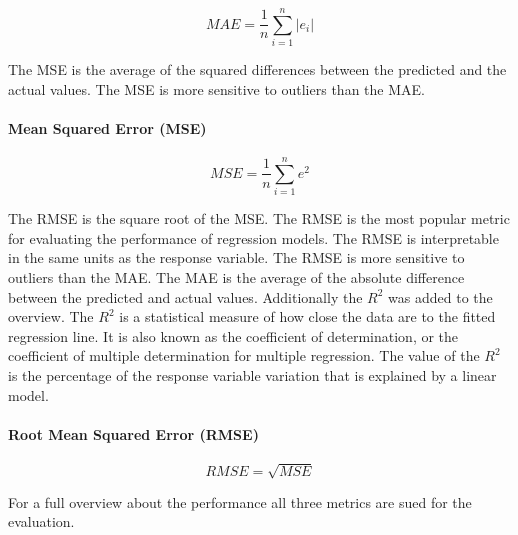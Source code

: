 \begin{equation}
    \label{eq:mae}
    MAE = \frac{1}{n} \sum_{i=1}^{n} |e_i|
\end{equation}

The MSE is the average of the squared differences between the predicted and the actual values. The MSE is more sensitive to outliers than the MAE.

\paragraph*{Mean Squared Error (MSE)}

\begin{equation}
    \label{eq:mse}
    MSE = \frac{1}{n} \sum_{i=1}^{n} e^2
\end{equation}

The RMSE is the square root of the MSE. The RMSE is the most popular metric for evaluating the performance of regression models. The RMSE is interpretable in the same units as the response variable. The RMSE is more sensitive to outliers than the MAE.
The MAE is the average of the absolute difference between the predicted and actual values.
Additionally the $R^2$ was added to the overview. The $R^2$ is a statistical measure of how close the data are to the fitted regression line. It is also known as the coefficient of determination, or the coefficient of multiple determination for multiple regression. The value of the $R^2$ is the percentage of the response variable variation that is explained by a linear model.

\paragraph*{Root Mean Squared Error (RMSE)}

\begin{equation}
    \label{eq:rmse}
    RMSE = \sqrt{MSE}
\end{equation}

For a full overview about the performance all three metrics are sued for the evaluation.



